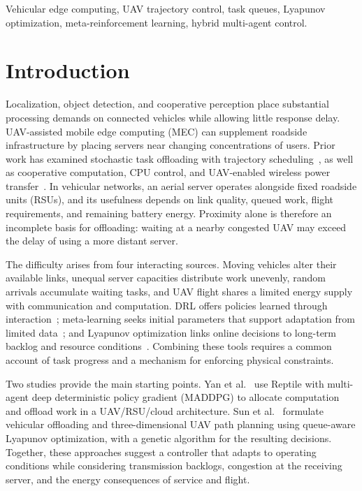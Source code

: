 \documentclass[journal]{IEEEtran}
\begin{document}
\begin{IEEEkeywords}
Vehicular edge computing, UAV trajectory control, task queues, Lyapunov optimization, meta-reinforcement learning, hybrid multi-agent control.
\end{IEEEkeywords}

\IEEEpeerreviewmaketitle

\section{Introduction}
Localization, object detection, and cooperative perception place substantial processing demands on connected vehicles while allowing little response delay. UAV-assisted mobile edge computing (MEC) can supplement roadside infrastructure by placing servers near changing concentrations of users. Prior work has examined stochastic task offloading with trajectory scheduling~\cite{zhang2019mobile}, as well as cooperative computation, CPU control, and UAV-enabled wireless power transfer~\cite{liu2020uav}. In vehicular networks, an aerial server operates alongside fixed roadside units (RSUs), and its usefulness depends on link quality, queued work, flight requirements, and remaining battery energy. Proximity alone is therefore an incomplete basis for offloading: waiting at a nearby congested UAV may exceed the delay of using a more distant server.

The difficulty arises from four interacting sources. Moving vehicles alter their available links, unequal server capacities distribute work unevenly, random arrivals accumulate waiting tasks, and UAV flight shares a limited energy supply with communication and computation. DRL offers policies learned through interaction~\cite{lowe2017multi,schulman2017proximal}; meta-learning seeks initial parameters that support adaptation from limited data~\cite{finn2017model,nichol2018reptile}; and Lyapunov optimization links online decisions to long-term backlog and resource conditions~\cite{neely2010stochastic,mao2017dynamic}. Combining these tools requires a common account of task progress and a mechanism for enforcing physical constraints.

Two studies provide the main starting points. Yan et al.\ \cite{yan2026rmaddpg} use Reptile with multi-agent deep deterministic policy gradient (MADDPG) to allocate computation and offload work in a UAV/RSU/cloud architecture. Sun et al.\ \cite{sun2026qtop} formulate vehicular offloading and three-dimensional UAV path planning using queue-aware Lyapunov optimization, with a genetic algorithm for the resulting decisions. Together, these approaches suggest a controller that adapts to operating conditions while considering transmission backlogs, congestion at the receiving server, and the energy consequences of service and flight.
\end{document}

